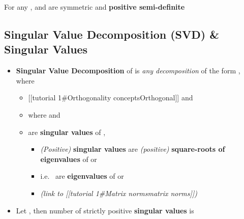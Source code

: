 \hSep %

For any ,  and
 are symmetric and \textbf{positive semi-definite}

\subsection*{Singular Value Decomposition (SVD) \& Singular
      Values}

\begin{itemize}

      \item
            \textbf{Singular Value Decomposition} of
             is \emph{any decomposition} of
            the form , where

            \begin{itemize}

                  \item
                        {[}{[}tutorial 1\#Orthogonality concepts\textbar Orthogonal{]}{]}
                        and
                  \item
                        where  and
                  \item
                         are \textbf{singular values}
                        of ,

                        \begin{itemize}

                              \item
                                    \emph{(Positive)} \textbf{singular values} are \emph{(positive)}
                                    \textbf{square-roots of eigenvalues} of  or
                              \item
                                    i.e.~ are
                                    \textbf{eigenvalues} of  or 
                              \item
                                     \emph{(link to
                                    {[}{[}tutorial 1\#Matrix norms\textbar matrix norms{]}{]})}
                        \end{itemize}
            \end{itemize}
      \item
            Let , then number of strictly positive
            \textbf{singular values} is 


\end{itemize}
